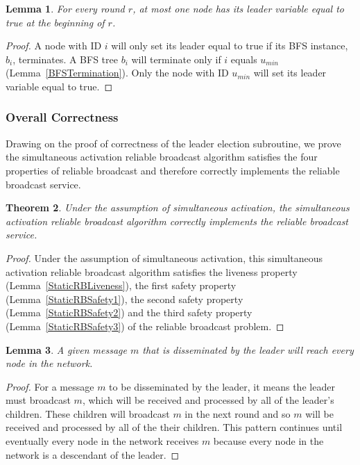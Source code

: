 \documentclass[english]{article}
\newtheorem{theorem}{Theorem}[section]
\newtheorem{lemma}[theorem]{Lemma}
\begin{document}
\begin{lemma}
\label{LESafetyStatic}
For every round $r$, at most one node has its leader variable equal to true at the beginning of $r$.
\end{lemma}
\begin{proof}
A node with ID $i$ will only set its leader equal to true if its BFS instance, $b_i$, terminates.
A BFS tree $b_i$ will terminate only if $i$ equals $u_{min}$ (Lemma~\ref{BFSTermination}).
Only the node with ID $u_{min}$ will set its leader variable equal to true. 
\end{proof}

\subsubsection {Overall Correctness}

Drawing on the proof of correctness of the leader election subroutine, we prove the simultaneous activation reliable broadcast algorithm satisfies the four properties of reliable broadcast and therefore correctly implements the reliable broadcast service.

\begin{theorem}
\label{StaticReliableBroadcast}
Under the assumption of simultaneous activation, the simultaneous activation reliable broadcast algorithm correctly implements the reliable broadcast service.
\end{theorem}
\begin{proof}
Under the assumption of simultaneous activation, this simultaneous activation reliable broadcast algorithm satisfies the liveness property (Lemma~\ref{StaticRBLiveness}), 
the first safety property (Lemma~\ref{StaticRBSafety1}),
the second safety property (Lemma~\ref{StaticRBSafety2}) and 
the third safety property (Lemma~\ref{StaticRBSafety3}) of the reliable broadcast problem.
\end{proof}

\begin{lemma}
\label{StaticMessageDissemination}
A given message $m$ that is disseminated by the leader will reach every node in the network.
\end{lemma}
\begin{proof}

For a message $m$ to be disseminated by the leader, it means the leader must broadcast $m$, which will be received and processed by all of the leader's children. These children will broadcast $m$ in the next round and so $m$ will be received and processed by all of the their children. This pattern continues until eventually every node in the network receives $m$ because every node in the network is a descendant of the leader. 

\end{proof}
\end{document}
